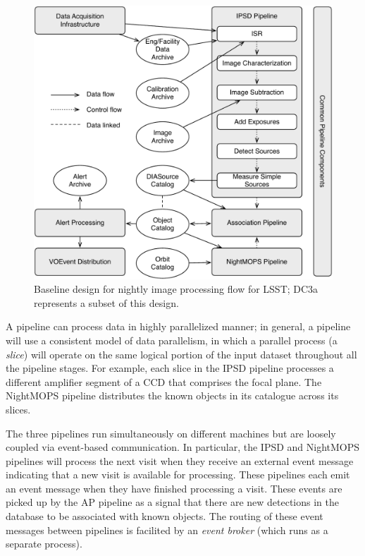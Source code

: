 \begin{itemize}
\begin{figure}[t]
\begin{center}
\includegraphics[width=4.5in]{images/LSSTpipes.pdf}
\caption{Baseline design for nightly image processing flow for LSST; DC3a represents
a subset of this design.  
\label{fig:lsstpipes}}
\end{center}
\end{figure}


\end{itemize}

A pipeline can process data in highly parallelized manner; in general,
a pipeline will use a consistent model of data parallelism, in which a
parallel process (a \textit{slice}) will operate on the same logical
portion of the input dataset throughout all the pipeline stages.  For
example, each slice in the IPSD pipeline processes a different
amplifier segment of a CCD that comprises the focal plane.  The
NightMOPS pipeline distributes the known objects in its catalogue
across its slices.  

The three pipelines run simultaneously on different machines but are
loosely coupled via event-based communication.  In particular, the
IPSD and NightMOPS pipelines will process the next visit when they
receive an external event message indicating that a new visit is
available for processing.  These pipelines each emit an event message
when they have finished processing a visit.  These events are picked
up by the AP pipeline as a signal that there are new detections in the
database to be associated with known objects.  The routing of these
event messages between pipelines is facilited by an \textit{event
broker} (which runs as a separate process).  

